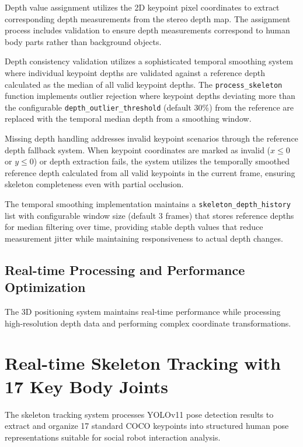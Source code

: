 Depth value assignment utilizes the 2D keypoint pixel coordinates to extract corresponding depth measurements from the stereo depth map. The assignment process includes validation to ensure depth measurements correspond to human body parts rather than background objects.

Depth consistency validation utilizes a sophisticated temporal smoothing system where individual keypoint depths are validated against a reference depth calculated as the median of all valid keypoint depths. The \texttt{process\_skeleton} function implements outlier rejection where keypoint depths deviating more than the configurable \texttt{depth\_outlier\_threshold} (default 30\%) from the reference are replaced with the temporal median depth from a smoothing window.

Missing depth handling addresses invalid keypoint scenarios through the reference depth fallback system. When keypoint coordinates are marked as invalid ($x \leq 0$ or $y \leq 0$) or depth extraction fails, the system utilizes the temporally smoothed reference depth calculated from all valid keypoints in the current frame, ensuring skeleton completeness even with partial occlusion.

The temporal smoothing implementation maintains a \texttt{skeleton\_depth\_history} list with configurable window size (default 3 frames) that stores reference depths for median filtering over time, providing stable depth values that reduce measurement jitter while maintaining responsiveness to actual depth changes.

\subsection{Real-time Processing and Performance Optimization}

The 3D positioning system maintains real-time performance while processing high-resolution depth data and performing complex coordinate transformations.



\section{Real-time Skeleton Tracking with 17 Key Body Joints}

The skeleton tracking system processes YOLOv11 pose detection results to extract and organize 17 standard COCO keypoints into structured human pose representations suitable for social robot interaction analysis.

